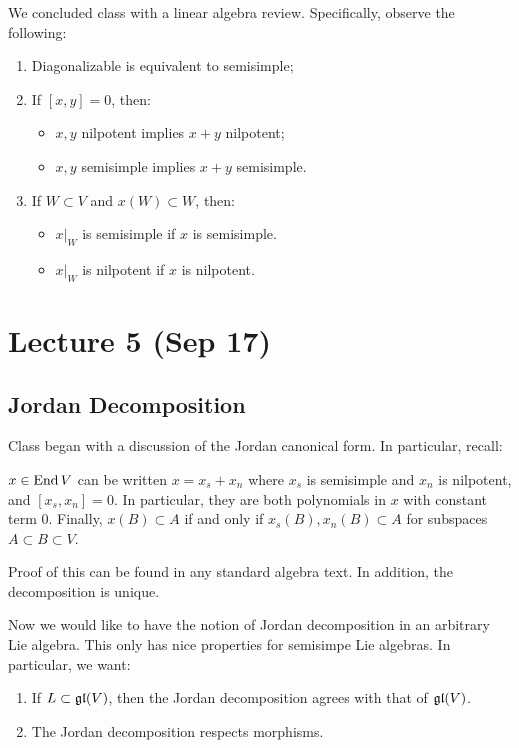 \documentclass[twoside, 10pt]{article}
\begin{document}
    We concluded class with a linear algebra review. Specifically, observe the following:
    \begin{enumerate}
        \item Diagonalizable is equivalent to semisimple;
        \item If $[x,y] = 0$, then:
            \begin{itemize}
                \item $x,y$ nilpotent implies $x+y$ nilpotent;
                \item $x,y$ semisimple implies $x+y$ semisimple.
            \end{itemize}
        \item If $W \subset V$ and $x(W) \subset W$, then:
            \begin{itemize}
                \item $x|_W$ is semisimple if $x$ is semisimple.
                \item $x|_W$ is nilpotent if $x$ is nilpotent.
            \end{itemize}
    \end{enumerate}

    \section{Lecture 5 (Sep 17)}%
    \label{sec:lecture_5_sep_17_}

    \subsection{Jordan Decomposition}%
    \label{sub:jordan_decomposition}
    
    
    Class began with a discussion of the Jordan canonical form. In particular, recall:

    \begin{prop}
        $x \in \operatorname{End} V$ can be written $x=x_s+x_n$ where $x_s$ is semisimple and $x_n$ is nilpotent, and $[x_s,x_n] = 0$. In particular, they are both polynomials in $x$ with constant term $0$. Finally, $x(B) \subset A$ if and only if $x_s(B), x_n(B) \subset A$ for subspaces $A \subset B \subset V$.
    \end{prop}

    Proof of this can be found in any standard algebra text. In addition, the decomposition is unique.

    Now we would like to have the notion of Jordan decomposition in an arbitrary Lie algebra. This only has nice properties for semisimpe Lie algebras. In particular, we want:
    \begin{enumerate}
        \item If $L \subset \mathfrak{gl}(V)$, then the Jordan decomposition agrees with that of $\mathfrak{gl}(V)$.
        \item The Jordan decomposition respects morphisms.
    \end{enumerate}
    
\end{document}
